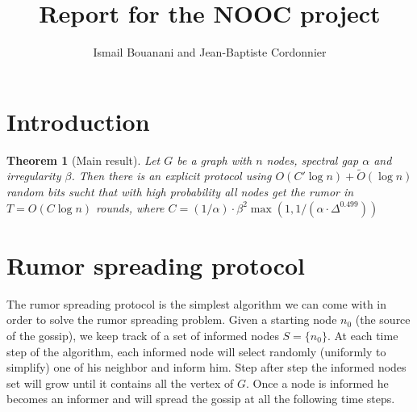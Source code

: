 \documentclass[10pt,journal,a4paper]{IEEEtran}
\begin{document}
%
\title{Report for the NOOC project}
\author{Ismail Bouanani and Jean-Baptiste Cordonnier}


\newcommand{\norm}[1]{\left\lVert#1\right\rVert}
\newtheorem{theorem}{Theorem}

\maketitle
\IEEEdisplaynotcompsoctitleabstractindextext

\section{Introduction}

\begin{theorem}[Main result]
  Let $G$ be a graph with $n$ nodes, spectral gap $\alpha$ and irregularity $\beta$. Then there is an explicit protocol using $O(C' \log n) + \tilde O(\log n)$ random bits sucht that with high probability all nodes get the rumor in $T=O(C \log n)$ rounds, where $C = (1/\alpha) \cdot \beta^2 \max(1, 1/(\alpha \cdot \Delta ^ {0.499}))$
\end{theorem}

\section{Rumor spreading protocol}

The rumor spreading protocol is the simplest algorithm we can come with in order to solve the rumor spreading problem. Given a starting node $n_0$ (the source of the gossip), we keep track of a set of informed nodes $S = \{n_0\}$. At each time step of the algorithm, each informed node will select randomly (uniformly to simplify) one of his neighbor and inform him. Step after step the informed nodes set will grow until it contains all the vertex of $G$. Once a node is informed he becomes an informer and will spread the gossip at all the following time steps.
\end{document}

